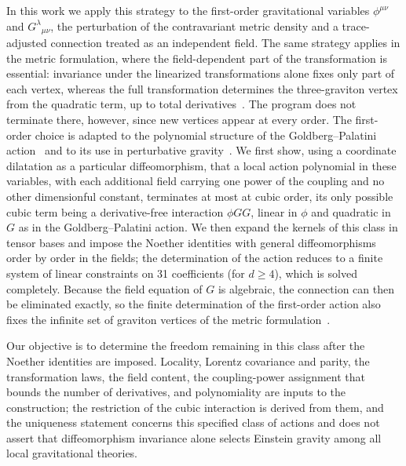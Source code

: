 \documentclass[prd,aps,preprint,nofootinbib,amsmath,amssymb,eqsecnum]{revtex4-2}
\begin{document}
In this work we apply this strategy to the first-order gravitational variables $\phi^{\mu\nu}$
and $G^{\lambda}{}_{\mu\nu}$, the perturbation of the contravariant metric density and a
trace-adjusted connection treated as an independent field. The
same strategy applies in the metric formulation, where the field-dependent part of the
transformation is essential: invariance under the linearized transformations alone fixes
only part of each vertex, whereas the full transformation determines the three-graviton
vertex from the quadratic term, up to total derivatives~\cite{BrandtFrenkel1996}. The
program does not terminate there, however, since new vertices appear at every order. The
first-order choice is adapted to the polynomial structure of the Goldberg--Palatini
action~\cite{Goldberg1958,Palatini1919,Ferraris1982} and to its use in perturbative
gravity~\cite{BrandtMcKeon2016}. We first show, using a coordinate dilatation as a particular
diffeomorphism, that a local action polynomial in these variables, with each additional field
carrying one power of the coupling and no other dimensionful constant, terminates at most at
cubic order, its only possible cubic term being a derivative-free interaction $\phi GG$, linear
in $\phi$ and quadratic in $G$ as in the Goldberg--Palatini action. We then expand the kernels
of this class in tensor bases and impose the Noether identities with general diffeomorphisms
order by order in the fields; the determination of the action reduces to a finite system of
linear constraints on 31 coefficients (for $d\geq4$), which is solved completely. Because the field equation of $G$ is algebraic, the
connection can then be eliminated exactly, so the finite determination of the first-order
action also fixes the infinite set of graviton vertices of the metric
formulation~\cite{BrandtMcKeon2016}.

Our objective is to determine the freedom remaining in this class after the Noether
identities are imposed. Locality, Lorentz covariance and parity, the transformation laws, the
field content, the coupling-power assignment that bounds the number of derivatives, and
polynomiality are inputs to the construction; the restriction of the cubic interaction is
derived from them, and the uniqueness statement concerns this specified class of actions and does not assert that
diffeomorphism invariance alone selects Einstein gravity among all local gravitational
theories.
\end{document}

